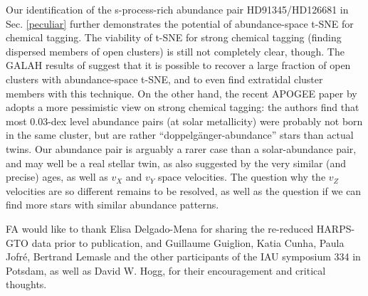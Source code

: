 \documentclass{aa}  %
\begin{document}
Our identification of the s-process-rich abundance pair HD91345/HD126681 in Sec. \ref{peculiar} further demonstrates the potential of abundance-space t-SNE for chemical tagging. The viability of t-SNE for strong chemical tagging (finding dispersed members of open clusters) is still not completely clear, though. The GALAH results of \citet{Kos2018} suggest that it is possible to recover a large fraction of open clusters with abundance-space t-SNE, and to even find extratidal cluster members with this technique. On the other hand, the recent APOGEE paper by \citet{Ness2018} adopts a more pessimistic view on strong chemical tagging: the authors find that most 0.03-dex level abundance pairs (at solar metallicity) were probably not born in the same cluster, but are rather ``doppelg\"anger-abundance'' stars than actual twins. Our abundance pair is arguably a rarer case than a solar-abundance pair, and may well be a real stellar twin, as also suggested by the very similar (and precise) ages, as well as  $v_X$ and $v_Y$ space velocities. The question why the $v_Z$ velocities are so different remains to be resolved, as well as the question if we can find more stars with similar abundance patterns.






\begin{acknowledgements}
FA would like to thank Elisa Delgado-Mena for sharing the re-reduced HARPS-GTO data prior to publication, and Guillaume Guiglion, Katia Cunha, Paula Jofr\'e, Bertrand Lemasle and the other participants of the IAU symposium 334 in Potsdam, as well as David W. Hogg, for their encouragement and critical thoughts. 

\end{acknowledgements}

\end{document}
